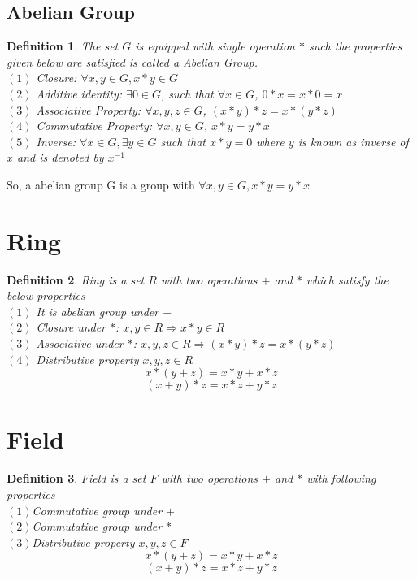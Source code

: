 \documentclass[a4paper,12pt]{report}
\newtheorem{definition}{Definition}
\begin{document}
\subsection{Abelian Group}
\begin{definition}
	The set $G$ is equipped with single operation $*$ such the properties given below are satisfied is called a Abelian Group.\\
	$(1)$ Closure: $\forall x,y \in G, x*y \in G$ \\
	$(2)$ Additive identity: $\exists 0 \in G$, such that $ \forall x \in G$, $ 0*x=x*0=x$\\
	$(3)$ Associative Property: $ \forall x,y,z \in G$, $(x*y)*z=x*(y*z)$ \\
	$(4)$ Commutative Property: $ \forall x,y \in G$, $x*y=y*x$ \\
	$(5)$ Inverse: $ \forall x \in G, \exists y \in G$ such that $x*y=0$ where $y$ is known as inverse of $x$ and is denoted by $x^{-1}$
\end{definition}
So, a abelian group G is a group with $\forall x,y \in G, x*y=y*x$

\section{Ring}
\begin{definition}
	Ring is a set $R$ with two operations $+$ and $*$ which satisfy the below properties\\
	$(1)$ It is abelian group under $+$ \\
	$(2)$ Closure under $*$:  $x,y \in R \Rightarrow	x*y \in R $  \\
	$(3)$ Associative under $*$: $x,y,z \in R \Rightarrow	(x*y)*z=x*(y*z) $\\
	$(4)$ Distributive property $x,y,z \in R$
	$$x*(y+z)=x*y+x*z$$ $$(x+y)*z=x*z+y*z$$
\end{definition}
\section{Field}
\begin{definition}
	Field is a set $F$ with two operations $+$ and $*$ with following properties \\
	$(1)$Commutative group under $+$\\
	$(2)$Commutative group under $*$\\
	$(3)$Distributive property $x,y,z \in F$
	$$x*(y+z)=x*y+x*z$$ $$(x+y)*z=x*z+y*z$$
\end{definition}
\end{document}
